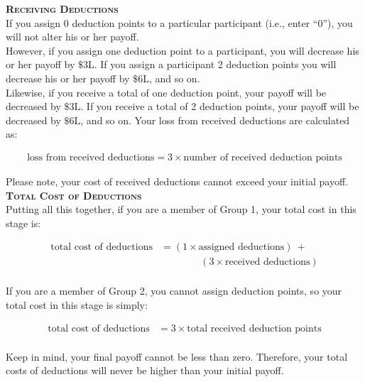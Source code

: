 \documentclass[12pt]{article}
\begin{document}
{\bf \scshape Receiving Deductions}\\

If you assign 0 deduction points to a particular participant (i.e., enter ``0''), you will not alter his or her payoff.\\

However, if you assign one deduction point to a participant, you will decrease his or her payoff by $\$3\text{L}$. If you assign a participant 2 deduction points you will decrease his or her payoff by $\$6\text{L}$, and so on.\\ 

Likewise, if you receive a total of one deduction point, your payoff will be decreased by $\$3\text{L}$. If you receive a total of 2 deduction points, your payoff will be decreased by $\$6\text{L}$, and so on. Your loss from received deductions are calculated as:

\begin{align*}
\text{loss from received deductions} = 3 \times \text{number of received deduction points}
\end{align*} 

Please note, your cost of received deductions cannot exceed your initial payoff.\\

{\bf \scshape Total Cost of Deductions}\\

Putting all this together, if you are a member of Group 1, your total cost in this stage is:

\begin{align*}
\text{total cost of deductions} &= (1 \times \text{assigned deductions}) ~ + \\
& \qquad \qquad (3 \times \text{received deductions})\\
\end{align*}

If you are a member of Group 2, you cannot assign deduction points, so your total cost in this stage is simply:

\begin{align*}
\text{total cost of deductions} &= 3 \times \text{total received deduction points}\\
\end{align*}

Keep in mind, your final payoff cannot be less than zero. Therefore, your total costs of deductions will never be higher than your initial payoff.\\
\end{document}
